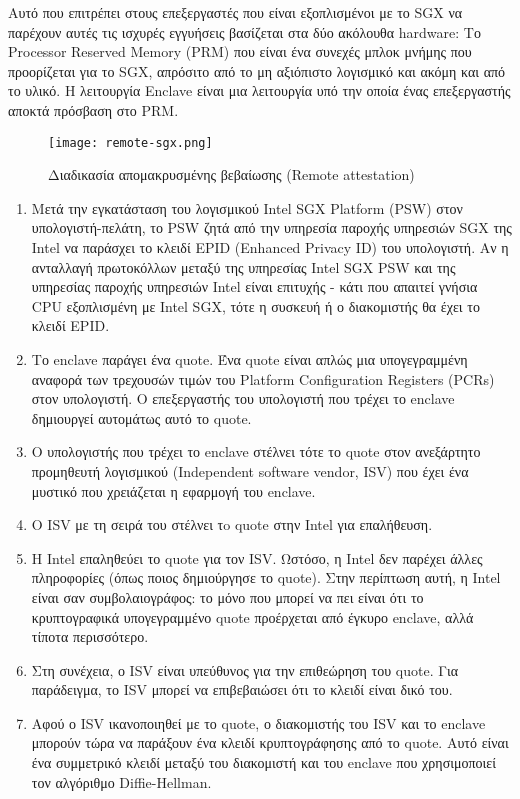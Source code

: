 Αυτό που επιτρέπει στους επεξεργαστές που είναι εξοπλισμένοι με το SGX να παρέχουν αυτές τις ισχυρές εγγυήσεις βασίζεται στα δύο ακόλουθα hardware: Το Processor Reserved Memory (PRM) που είναι ένα συνεχές μπλοκ μνήμης που προορίζεται για το SGX, απρόσιτο από το μη αξιόπιστο λογισμικό και ακόμη και από το υλικό. Η λειτουργία Enclave είναι μια λειτουργία υπό την οποία ένας επεξεργαστής αποκτά πρόσβαση στο PRM.

\begin{figure}[H]
\centering
  \texttt{[image: remote-sgx.png]}
  \caption{Διαδικασία απομακρυσμένης βεβαίωσης (Remote attestation) }
  \label{fig:remote_attestation_sgx}
\end{figure}

\begin{enumerate}
   \item Μετά την εγκατάσταση του λογισμικού Intel SGX Platform (PSW) στον υπολογιστή-πελάτη, το PSW ζητά από την υπηρεσία παροχής υπηρεσιών SGX της Intel να παράσχει το κλειδί EPID (Enhanced Privacy ID) του υπολογιστή. Αν η ανταλλαγή πρωτοκόλλων μεταξύ της υπηρεσίας Intel SGX PSW και της υπηρεσίας παροχής υπηρεσιών Intel είναι επιτυχής - κάτι που απαιτεί γνήσια CPU εξοπλισμένη με Intel SGX, τότε η συσκευή ή ο διακομιστής θα  έχει το κλειδί EPID.
   \item Το enclave παράγει ένα quote. Ένα quote είναι απλώς μια υπογεγραμμένη αναφορά των τρεχουσών τιμών του Platform Configuration Registers (PCRs) στον υπολογιστή. Ο επεξεργαστής του υπολογιστή που τρέχει το enclave δημιουργεί αυτομάτως αυτό το quote.

\item Ο υπολογιστής που τρέχει το enclave στέλνει τότε το quote στον ανεξάρτητο προμηθευτή λογισμικού (Independent software vendor, ISV) που έχει ένα μυστικό που χρειάζεται η εφαρμογή του enclave.

\item O ISV με τη σειρά του στέλνει τo quote στην Intel για επαλήθευση.

\item Η Intel επαληθεύει το quote για τον ISV. Ωστόσο, η Intel δεν παρέχει άλλες πληροφορίες (όπως ποιος δημιούργησε το quote). Στην περίπτωση αυτή, η Intel είναι σαν συμβολαιογράφος: το μόνο που μπορεί να πει είναι ότι το κρυπτογραφικά υπογεγραμμένο quote προέρχεται από έγκυρο enclave, αλλά τίποτα περισσότερο.
\item Στη συνέχεια, ο ISV είναι υπεύθυνος για την επιθεώρηση του quote. Για παράδειγμα, το ISV μπορεί να επιβεβαιώσει ότι το κλειδί είναι δικό του.
\item Αφού ο ISV ικανοποιηθεί με το quote, ο διακομιστής του ISV και το enclave μπορούν τώρα να παράξουν ένα κλειδί κρυπτογράφησης από το quote. Αυτό είναι ένα συμμετρικό κλειδί μεταξύ του διακομιστή και του enclave που χρησιμοποιεί τον αλγόριθμο Diffie-Hellman.
 \end{enumerate}
